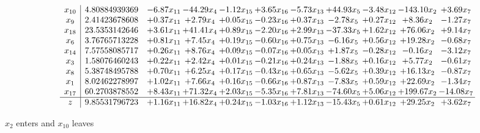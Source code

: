 \documentclass[9pt]{article}
\begin{document}
 \[\begin{array}{c| c c@{\hskip 2pt} c@{\hskip 2pt} c@{\hskip 2pt} c@{\hskip 2pt} c@{\hskip 2pt} c@{\hskip 2pt} c@{\hskip 2pt} c@{\hskip 2pt} c@{\hskip 2pt} }
 x_{10}   &  4.80884939369 & -6.87 x_{11} & -44.29 x_{4} & -1.12 x_{15} & +  3.65 x_{16} & -5.73 x_{13} & + 44.93 x_{5} & -3.48 x_{12} & -143.10 x_{2} & +  3.69 x_{7}\\
 x_{9}   &  2.41423678608 & +  0.37 x_{11} & +  2.79 x_{4} & +  0.05 x_{15} & -0.23 x_{16} & +  0.37 x_{13} & -2.78 x_{5} & +  0.27 x_{12} & +  8.36 x_{2} & -1.27 x_{7}\\
 x_{18}   &  23.5353142646 & +  3.61 x_{11} & + 41.41 x_{4} & +  0.89 x_{15} & -2.20 x_{16} & +  2.99 x_{13} & -37.33 x_{5} & +  1.62 x_{12} & + 76.06 x_{2} & +  9.14 x_{7}\\
 x_{6}   &  3.76765713228 & +  0.81 x_{11} & +  7.45 x_{4} & +  0.19 x_{15} & -0.60 x_{16} & +  0.75 x_{13} & -6.16 x_{5} & +  0.56 x_{12} & + 19.28 x_{2} & -0.68 x_{7}\\
 x_{14}   &  7.57558085717 & +  0.26 x_{11} & +  8.76 x_{4} & +  0.09 x_{15} & -0.07 x_{16} & +  0.05 x_{13} & +  1.87 x_{5} & -0.28 x_{12} & -0.16 x_{2} & -3.12 x_{7}\\
 x_{3}   &  1.58076460243 & +  0.22 x_{11} & +  2.42 x_{4} & +  0.01 x_{15} & -0.21 x_{16} & +  0.24 x_{13} & -1.88 x_{5} & +  0.16 x_{12} & +  5.77 x_{2} & -0.61 x_{7}\\
 x_{8}   &  5.38748495788 & +  0.70 x_{11} & +  6.25 x_{4} & +  0.17 x_{15} & -0.43 x_{16} & +  0.65 x_{13} & -5.62 x_{5} & +  0.39 x_{12} & + 16.13 x_{2} & -0.87 x_{7}\\
 x_{1}   &  8.02462278997 & +  1.02 x_{11} & +  7.66 x_{4} & +  0.16 x_{15} & -0.66 x_{16} & +  0.87 x_{13} & -7.83 x_{5} & +  0.59 x_{12} & + 22.69 x_{2} & -1.34 x_{7}\\
 x_{17}   &  60.2703878552 & +  8.43 x_{11} & + 71.32 x_{4} & +  2.03 x_{15} & -5.35 x_{16} & +  7.81 x_{13} & -74.60 x_{5} & +  5.06 x_{12} & + 199.67 x_{2} & -14.08 x_{7}\\
\hline
z    &  9.85531796723 & +  1.16 x_{11} & + 16.82 x_{4} & +  0.24 x_{15} & -1.03 x_{16} & +  1.12 x_{13} & -15.43 x_{5} & +  0.61 x_{12} & + 29.25 x_{2} & +  3.62 x_{7}\\
\end{array}\]


 $ x_{2} $ enters and $ x_{10} $ leaves 
\end{document}
